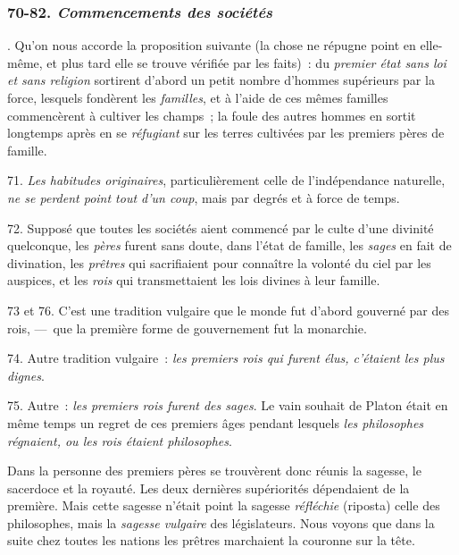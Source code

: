 \documentclass[french,twoside]{book} %
\begin{document}
\subsubsection[{70-82. Commencements des sociétés}]{ \textsc{70-82. } {\itshape Commencements des sociétés} }
. Qu’on nous accorde la proposition suivante (la chose ne répugne point en elle-même, et plus tard elle se trouve vérifiée par les faits) : du {\itshape premier état sans loi et sans religion} sortirent d’abord un petit nombre d’hommes supérieurs par la force, lesquels fondèrent les {\itshape familles}, et à l’aide de ces mêmes familles commencèrent à cultiver les champs ; la foule des autres hommes en sortit longtemps après en se {\itshape réfugiant} sur les terres cultivées par les premiers pères de famille.\par
71. {\itshape Les habitudes originaires}, particulièrement celle de l’indépendance naturelle, {\itshape ne se perdent point tout d’un coup}, mais par degrés et à force de temps.\par
72. Supposé que toutes les sociétés aient commencé par le culte d’une divinité quelconque, les {\itshape pères} furent sans doute, dans l’état de famille, les {\itshape sages} en fait de divination, les {\itshape prêtres} qui sacrifiaient pour connaître la volonté du ciel par les  auspices, et les {\itshape rois} qui transmettaient les lois divines à leur famille.\par
73 et 76. C’est une tradition vulgaire que le monde fut d’abord gouverné par des rois, — que la première forme de gouvernement fut la monarchie.\par
74. Autre tradition vulgaire : {\itshape les premiers rois qui furent élus, c’étaient les plus dignes}.\par
75. Autre : {\itshape les premiers rois furent des sages}. Le vain souhait de Platon était en même temps un regret de ces premiers âges pendant lesquels {\itshape les philosophes régnaient, ou les rois étaient philosophes}.\par
Dans la personne des premiers pères se trouvèrent donc réunis la sagesse, le sacerdoce et la royauté. Les deux dernières supériorités dépendaient de la première. Mais cette sagesse n’était point la sagesse {\itshape réfléchie} (riposta) celle des philosophes, mais la {\itshape sagesse vulgaire} des législateurs. Nous voyons que dans la suite chez toutes les nations les prêtres marchaient la couronne sur la tête.\par
\end{document}
